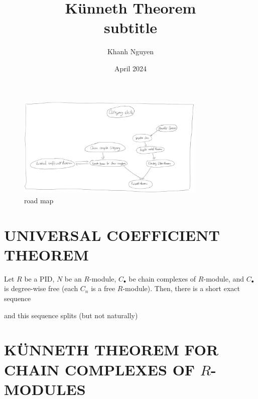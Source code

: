 \documentclass{article}
\title{
    Künneth Theorem \\
    \large
    subtitle
}
\author{Khanh Nguyen}
\date{April 2024}
\begin{document}
\maketitle

\begin{center}
    \begin{figure}
        \centering
        \includegraphics[width=0.8\textwidth]{roadmap.jpg}
        \caption{road map}
        \label{fig:roadmap}
    \end{figure}
\end{center}

\section{UNIVERSAL COEFFICIENT THEOREM}

\begin{theorem}
    Let $R$ be a PID, $N$ be an $R$-module, $C_\bullet$ be chain complexes of $R$-module, and $C_\bullet$ is degree-wise free (each $C_n$ is a free $R$-module). Then, there is a short exact sequence
    \begin{center}
    \end{center}
    and this sequence splits (but not naturally)
\end{theorem}

\section{KÜNNETH THEOREM FOR CHAIN COMPLEXES OF $R$-MODULES}
\end{document}
